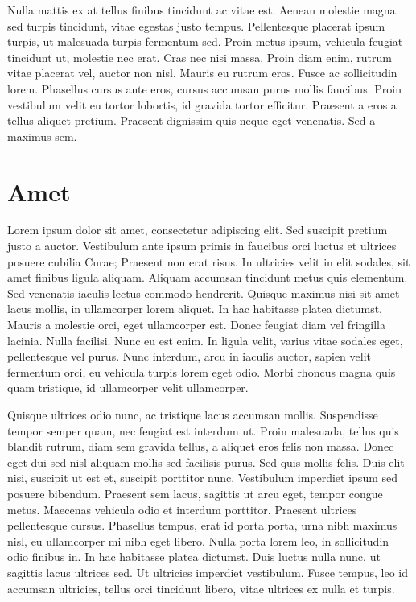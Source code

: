 Nulla mattis ex at tellus finibus tincidunt ac vitae est. Aenean molestie magna sed turpis tincidunt, vitae egestas justo tempus. Pellentesque placerat ipsum turpis, ut malesuada turpis fermentum sed. Proin metus ipsum, vehicula feugiat tincidunt ut, molestie nec erat. Cras nec nisi massa. Proin diam enim, rutrum vitae placerat vel, auctor non nisl. Mauris eu rutrum eros. Fusce ac sollicitudin lorem. Phasellus cursus ante eros, cursus accumsan purus mollis faucibus. Proin vestibulum velit eu tortor lobortis, id gravida tortor efficitur. Praesent a eros a tellus aliquet pretium. Praesent dignissim quis neque eget venenatis. Sed a maximus sem.

\section{Amet}

Lorem ipsum dolor sit amet, consectetur adipiscing elit. Sed suscipit pretium justo a auctor. Vestibulum ante ipsum primis in faucibus orci luctus et ultrices posuere cubilia Curae; Praesent non erat risus. In ultricies velit in elit sodales, sit amet finibus ligula aliquam. Aliquam accumsan tincidunt metus quis elementum. Sed venenatis iaculis lectus commodo hendrerit. Quisque maximus nisi sit amet lacus mollis, in ullamcorper lorem aliquet. In hac habitasse platea dictumst. Mauris a molestie orci, eget ullamcorper est. Donec feugiat diam vel fringilla lacinia. Nulla facilisi. Nunc eu est enim. In ligula velit, varius vitae sodales eget, pellentesque vel purus. Nunc interdum, arcu in iaculis auctor, sapien velit fermentum orci, eu vehicula turpis lorem eget odio. Morbi rhoncus magna quis quam tristique, id ullamcorper velit ullamcorper.

Quisque ultrices odio nunc, ac tristique lacus accumsan mollis. Suspendisse tempor semper quam, nec feugiat est interdum ut. Proin malesuada, tellus quis blandit rutrum, diam sem gravida tellus, a aliquet eros felis non massa. Donec eget dui sed nisl aliquam mollis sed facilisis purus. Sed quis mollis felis. Duis elit nisi, suscipit ut est et, suscipit porttitor nunc. Vestibulum imperdiet ipsum sed posuere bibendum. Praesent sem lacus, sagittis ut arcu eget, tempor congue metus. Maecenas vehicula odio et interdum porttitor. Praesent ultrices pellentesque cursus. Phasellus tempus, erat id porta porta, urna nibh maximus nisl, eu ullamcorper mi nibh eget libero. Nulla porta lorem leo, in sollicitudin odio finibus in. In hac habitasse platea dictumst. Duis luctus nulla nunc, ut sagittis lacus ultrices sed. Ut ultricies imperdiet vestibulum. Fusce tempus, leo id accumsan ultricies, tellus orci tincidunt libero, vitae ultrices ex nulla et turpis.

